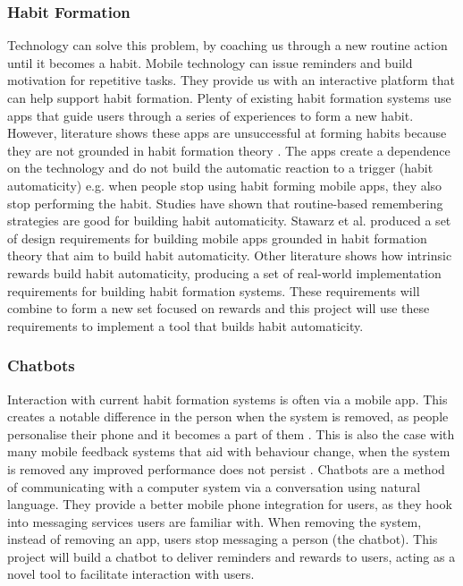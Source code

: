 \subsubsection*{Habit Formation}
Technology can solve this problem, by coaching us through a new routine action until it becomes a habit. Mobile technology can issue reminders and build motivation for repetitive tasks. They provide us with an interactive platform that can help support habit formation. Plenty of existing habit formation systems use apps that guide users through a series of experiences to form a new habit. However, literature shows these apps are unsuccessful at forming habits because they are not grounded in habit formation theory \cite{article_beyond_self_tracking_designing_apps, article_apps_of_steel}. The apps create a dependence on the technology and do not build the automatic reaction to a trigger (habit automaticity) \cite{article_dont_kick_habit} e.g. when people stop using habit forming mobile apps, they also stop performing the habit.\newline
\newline
Studies have shown that routine-based remembering strategies are good for building habit automaticity. Stawarz et al. \cite{article_dont_forget_your_pill} produced a set of design requirements for building mobile apps grounded in habit formation theory that aim to build habit automaticity. Other literature \cite{article_taxonomy_motivational_affordances_meaningful} shows how intrinsic rewards build habit automaticity, producing a set of real-world implementation requirements for building habit formation systems. These requirements will combine to form a new set focused on rewards and this project will use these requirements to implement a tool that builds habit automaticity.

\subsubsection*{Chatbots}
Interaction with current habit formation systems is often via a mobile app. This creates a notable difference in the person when the system is removed, as people personalise their phone and it becomes a part of them \cite{article_my_phone_is_part_of_my_soul}. This is also the case with many mobile feedback systems that aid with behaviour change, when the system is removed any improved performance does not persist \cite{article_dont_kick_habit, article_realtime_feedback_improving_medication_taking}.\newline
\newline
Chatbots are a method of communicating with a computer system via a conversation using natural language. They provide a better mobile phone integration for users, as they hook into messaging services users are familiar with. When removing the system, instead of removing an app, users stop messaging a person (the chatbot). This project will build a chatbot to deliver reminders and rewards to users, acting as a novel tool to facilitate interaction with users.

